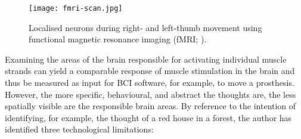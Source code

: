 \begin{figure}[ht]
  \centering
  \texttt{[image: fmri-scan.jpg]}
  \caption[Localised neurons during right- and left- thumb movement using functional magnetic resonance imaging (fMRI).]{Localised neurons during right- and left-thumb movement using functional magnetic resonance imaging (fMRI; \cite{rashid_bilateral_2018}).}
  \label{fig:fmri-scan}
\end{figure}

Examining the areas of the brain responsible for activating individual muscle strands can yield a comparable response of muscle stimulation in the brain and thus be measured as input for BCI software, for example, to move a prosthesis. However, the more specific, behavioural, and abstract the thoughts are, the less spatially visible are the responsible brain areas. By reference to the intention of identifying, for example, the thought of a red house in a forest, the author has identified three technological limitations:

